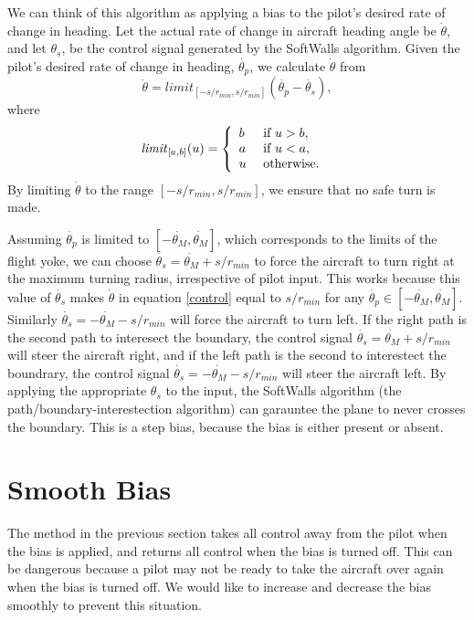 \documentclass[11pt]{article}
\begin{document}
We can think of this algorithm as applying a bias to the pilot's
desired rate of change in heading.  Let the actual rate of change in
aircraft heading angle be $\dot{\theta}$, and let $\theta_{s}$, be the
control signal generated by the SoftWalls algorithm.  Given the
pilot's desired rate of change in heading, $\dot{\theta_{p}}$, we
calculate $\dot{\theta}$ from
\begin{equation}
\dot{\theta} = limit_{[-s/r_{min}, s/r_{min}]}(\dot{\theta_{p}} -
\dot{\theta_{s}}),
\label{control}
\end{equation}
where
\[
\mbox{\textit{limit}}_{[a,b]}(u) = \left \{
\begin{array}{ll}
b&\mbox{ if } u > b,\\
a&\mbox{ if } u < a,\\
u&\mbox{ otherwise. }
\end{array}
\right .
\]
By limiting $\dot{\theta}$ to the range $[-s/r_{min}, s/r_{min}]$, we
ensure that no safe turn is made.

Assuming $\dot{\theta_{p}}$ is limited to $[-\dot{\theta_{M}},
\dot{\theta_{M}}]$, which corresponds to the limits of the flight
yoke, we can choose $\dot{\theta_{s}} = \dot{\theta_{M}} + s/r_{min}$
to force the aircraft to turn right at the maximum turning radius,
irrespective of pilot input.  This works because this value of
$\dot{\theta_{s}}$ makes $\dot{\theta}$ in equation \ref{control}
equal to $s/r_{min}$ for any $\dot{\theta_{p}} \in [-\dot{\theta_{M}},
\dot{\theta_{M}}]$.  Similarly $\dot{\theta_{s}} = -\dot{\theta_{M}} -
s/r_{min}$ will force the aircraft to turn left.  If the right path is
the second path to interesect the boundary, the control signal
$\dot{\theta_{s}} = \dot{\theta_{M}} + s/r_{min}$ will steer the
aircraft right, and if the left path is the second to interestect the
boundrary, the control signal $\dot{\theta_{s}} = -\dot{\theta_{M}} -
s/r_{min}$ will steer the aircraft left.  By applying the appropriate
$\theta_{s}$ to the input, the SoftWalls algorithm (the
path/boundary-interestection algorithm) can garauntee the plane to
never crosses the boundary.  This is a step bias, because the bias is
either present or absent.

\section{Smooth Bias}

The method in the previous section takes all control away from the
pilot when the bias is applied, and returns all control when the bias
is turned off.  This can be dangerous because a pilot may not be ready
to take the aircraft over again when the bias is turned off.  We would
like to increase and decrease the bias smoothly to prevent this
situation.
\end{document}
